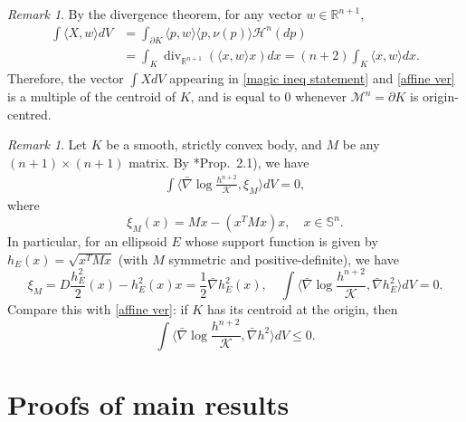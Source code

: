 \documentclass[12pt]{amsart}
\theoremstyle{definition}
\numberwithin{equation}{section}
\newcommand{\M}{\mathcal{M}}
\newcommand{\Rn}{\mathbb{R}^{n+1}}
\theoremstyle{remark}
\newtheorem{remark}[theorem]{Remark}
\numberwithin{equation}{section}
\begin{document}
\begin{remark}\label{centroid}
By the divergence theorem, for any vector $w \in \mathbb{R}^{n+1}$,
\begin{align*}
\int \langle X,w\rangle dV & =\int_{\partial K} \langle p,w\rangle\langle p,\nu(p)\rangle \mathcal{H}^n(dp) \\
& =\int_{K} \operatorname{div}_{\Rn}(\langle x,w\rangle x ) dx =(n+2)\int_K \langle x,w\rangle dx.
\end{align*}
Therefore, the vector $\int XdV$ appearing in \eqref{magic ineq statement} and \eqref{affine ver} is a multiple of the centroid of $K$, and is equal to $0$ whenever $\M^n = \partial K$ is origin-centred. 
\end{remark}

\begin{remark}
Let $K$ be a smooth, strictly convex body, and 
$M$ be any $(n+1)\times (n+1)$ matrix. By \cite{LW13}*{Prop.~2.1}), we have
\begin{align*}
\int \langle \bar{\nabla}\log \frac{h^{n+2}}{\mathcal{K}}, \xi_M \rangle dV=0,
\end{align*}
where
\[\xi_M(x)=M x-(x^TM x)x,\quad x\in \mathbb{S}^n.\]
In particular, for an ellipsoid $E$ whose support function is given by $h_E(x)=\sqrt{x^TMx}$ (with $M$ symmetric and positive-definite), we have
\[\xi_M= D \frac{h_E^2}{2}(x)-h_E^2(x)x=\frac{1}{2}\bar{\nabla} h_E^2(x),\quad \int \langle \bar{\nabla}\log \frac{h^{n+2}}{\mathcal{K}},\bar{\nabla} h_E^2 \rangle dV =0. \]
Compare this with \eqref{affine ver}: if $K$ has its centroid at the origin, then
\[\int \langle \bar{\nabla}\log \frac{h^{n+2}}{\mathcal{K}},\bar{\nabla} h^2  \rangle dV \leq 0.\]
\end{remark}

\section{Proofs of main results}
\end{document}
